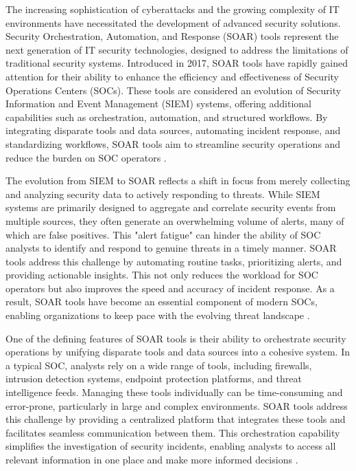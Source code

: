 The increasing sophistication of cyberattacks and the growing complexity of IT environments have necessitated the development of advanced security solutions. Security Orchestration, Automation, and Response (SOAR) tools represent the next generation of IT security technologies, designed to address the limitations of traditional security systems. Introduced in 2017, SOAR tools have rapidly gained attention for their ability to enhance the efficiency and effectiveness of Security Operations Centers (SOCs). These tools are considered an evolution of Security Information and Event Management (SIEM) systems, offering additional capabilities such as orchestration, automation, and structured workflows. By integrating disparate tools and data sources, automating incident response, and standardizing workflows, SOAR tools aim to streamline security operations and reduce the burden on SOC operators \citep{empl2022, katsikas2022}.

The evolution from SIEM to SOAR reflects a shift in focus from merely collecting and analyzing security data to actively responding to threats. While SIEM systems are primarily designed to aggregate and correlate security events from multiple sources, they often generate an overwhelming volume of alerts, many of which are false positives. This "alert fatigue" can hinder the ability of SOC analysts to identify and respond to genuine threats in a timely manner. SOAR tools address this challenge by automating routine tasks, prioritizing alerts, and providing actionable insights. This not only reduces the workload for SOC operators but also improves the speed and accuracy of incident response. As a result, SOAR tools have become an essential component of modern SOCs, enabling organizations to keep pace with the evolving threat landscape \citep{bridges2023}.

One of the defining features of SOAR tools is their ability to orchestrate security operations by unifying disparate tools and data sources into a cohesive system. In a typical SOC, analysts rely on a wide range of tools, including firewalls, intrusion detection systems, endpoint protection platforms, and threat intelligence feeds. Managing these tools individually can be time-consuming and error-prone, particularly in large and complex environments. SOAR tools address this challenge by providing a centralized platform that integrates these tools and facilitates seamless communication between them. This orchestration capability simplifies the investigation of security incidents, enabling analysts to access all relevant information in one place and make more informed decisions \citep{empl2022, katsikas2022}.

